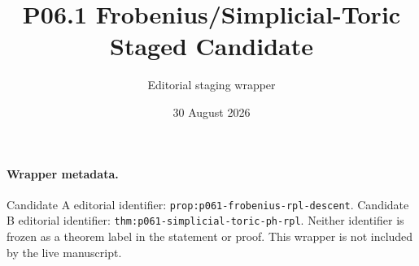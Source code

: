 \documentclass[11pt]{article}
\title{P06.1 Frobenius/Simplicial-Toric Staged Candidate}
\author{Editorial staging wrapper}
\date{30 August 2026}
\begin{document}
\maketitle

\paragraph{Wrapper metadata.}
Candidate A editorial identifier:
\texttt{prop:p061-frobenius-rpl-descent}.
Candidate B editorial identifier:
\texttt{thm:p061-simplicial-toric-ph-rpl}.
Neither identifier is frozen as a theorem label in the statement or proof.
This wrapper is not included by the live manuscript.



\end{document}
